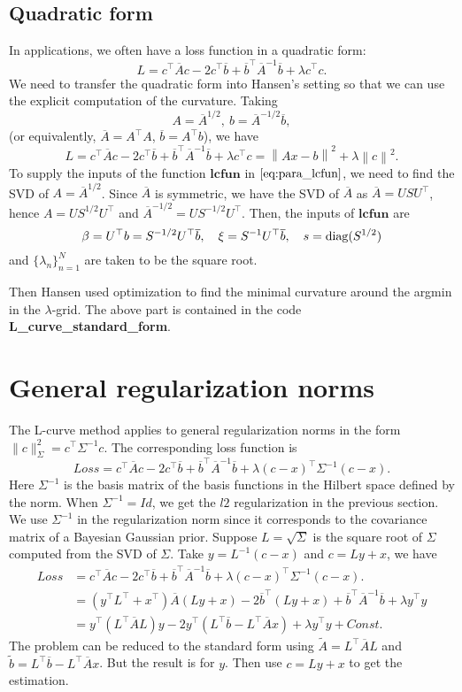 \documentclass{article} %
\theoremstyle{plain}
\numberwithin{equation}{section}
\def\Abar{\overline{A}}
\def\bbar{\overline{b}}
\newcommand{\norm}[1]{\left\|#1\right\|}
\begin{document}
\subsection{Quadratic form}
In applications, we often have a loss function in a quadratic form: 
$$
L = c^\top \Abar c - 2 c^\top \bbar + \bbar^\top \Abar^{-1} \bbar + \lambda c^\top c.
$$
We need to transfer the quadratic form into Hansen's setting so that we can use the explicit computation of the curvature. Taking  
$$A = \Abar^{1/2}, \  b = \Abar^{-1/2}\bbar,$$ 
(or equivalently, $\Abar = A^\top A$, $\bbar= A^\top b$), we have 
$$
L = c^\top \Abar c - 2 c^\top \bbar + \bbar^\top \Abar^{-1} \bbar + \lambda c^\top c= \norm{A x - b}^2 + \lambda \norm{c}^2.
$$
To supply the inputs of the function $\textbf{lcfun}$ in $\eqref{eq:para_lcfun}$, we  need to find the SVD of $A= \Abar^{1/2}$. Since $\Abar$ is symmetric, we have the SVD of $\Abar$ as $\Abar = USU^\top $, hence $A = US^{1/2}U^\top$ and $\Abar^{-1/2} = US^{-1/2}U^\top$. Then,  the inputs of $\textbf{lcfun}$ are
\begin{equation}\label{eq:lcfun_qf}
\beta = U^\top  b = S^{-1/2}U^\top \bbar, \quad \xi = S^{-1}U^\top \bbar, \quad s = {\rm diag}(S^{1/2})
\end{equation}
and $\{\lambda_n\}_{n = 1}^N$ are taken to be the square root. 

Then Hansen used optimization to find the minimal curvature around the argmin in the $\lambda$-grid. The above part is contained in the code \textbf{L\_curve\_standard\_form}.

\section{General regularization norms}
The L-curve method applies to general regularization norms in the form $\|c\|_\Sigma^2 = c^\top \Sigma^{-1}c$. The corresponding loss function is 
$$
Loss =  c^\top \Abar c - 2 c^\top \bbar + \bbar^\top \Abar^{-1} \bbar + \lambda (c-x)^\top \Sigma^{-1} (c-x).
$$
Here $\Sigma^{-1}$ is the basis matrix of the basis functions in the Hilbert space defined by the norm.  When $\Sigma^{-1}=Id$, we get the $l2$ regularization in the previous section. We use $\Sigma^{-1}$ in the regularization norm since it corresponds to the covariance matrix of a Bayesian Gaussian prior. Suppose $L = \sqrt{\Sigma}$ is the square root of $\Sigma$ computed from the SVD of $\Sigma$. Take $y = L^{-1}(c-x)$ and $c = Ly + x$, we have 
\begin{align}
Loss &=  c^\top \Abar c - 2 c^\top \bbar + \bbar^\top \Abar^{-1} \bbar + \lambda (c-x)^\top \Sigma^{-1} (c-x).\\
&= (y^\top L^\top + x^\top) \Abar (L y + x) - 2 \bbar^\top (L y + x) + \bbar^\top \Abar^{-1}\bbar + \lambda y^\top y\\
&=
y^\top( L^\top \Abar L) y - 2y^\top (L^\top \bbar -L^\top \Abar x) + \lambda y^\top y + Const.
\end{align}
The problem can be reduced to the standard form using $\tilde A = L^\top \Abar L$ and $\tilde b = L^\top \bbar - L^\top \Abar x$. But the result is for $y$. Then use $c = Ly + x$ to get the estimation. 
\end{document}
